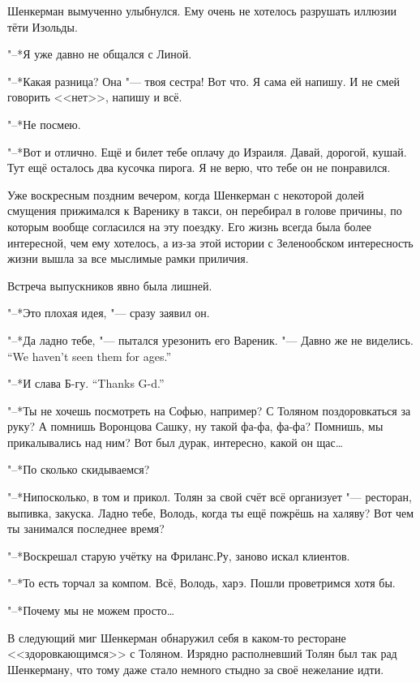 Шенкерман вымученно улыбнулся.
Ему очень не хотелось разрушать иллюзии тёти Изольды.

"--*Я уже давно не общался с Линой.

"--*Какая разница?
Она "--- твоя сестра!
Вот что.
Я сама ей напишу.
И не смей говорить <<нет>>, напишу и всё.

"--*Не посмею.

"--*Вот и отлично.
Ещё и билет тебе оплачу до Израиля.
Давай, дорогой, кушай.
Тут ещё осталось два кусочка пирога.
Я не верю, что тебе он не понравился.

\textspace

\asterism

\label{Sun_2012_07_22}

Уже воскресным поздним вечером, когда Шенкерман с некоторой долей смущения прижимался к Варенику в такси, он перебирал в голове причины, по которым вообще согласился на эту поездку.
Его жизнь всегда была более интересной, чем ему хотелось, а из-за этой истории с Зеленообском интересность жизни вышла за все мыслимые рамки приличия.

Встреча выпускников явно была лишней.

"--*Это плохая идея, "--- сразу заявил он.

"--*Да ладно тебе, "--- пытался урезонить его Вареник.
{"--- Давно же не виделись.}
{``We haven't seen them for ages.''}

{"--*И слава Б-гу.}
{``Thanks G-d.''}

"--*Ты не хочешь посмотреть на Софью, например?
С Толяном поздоровкаться за руку?
А помнишь Воронцова Сашку, ну такой фа-фа, фа-фа?
Помнишь, мы прикалывались над ним?
Вот был дурак, интересно, какой он щас\ldots{}

"--*По сколько скидываемся?

"--*Нипосколько, в том и прикол.
Толян за свой счёт всё организует "--- ресторан, выпивка, закуска.
Ладно тебе, Володь, когда ты ещё пожрёшь на халяву?
Вот чем ты занимался последнее время?

"--*Воскрешал старую учётку на Фриланс.Ру, заново искал клиентов.

"--*То есть торчал за компом.
Всё, Володь, харэ.
Пошли проветримся хотя бы.

"--*Почему мы не можем просто\ldots{}

В следующий миг Шенкерман обнаружил себя в каком-то ресторане <<здоровкающимся>> с Толяном.
Изрядно располневший Толян был так рад Шенкерману, что тому даже стало немного стыдно за своё нежелание идти.


